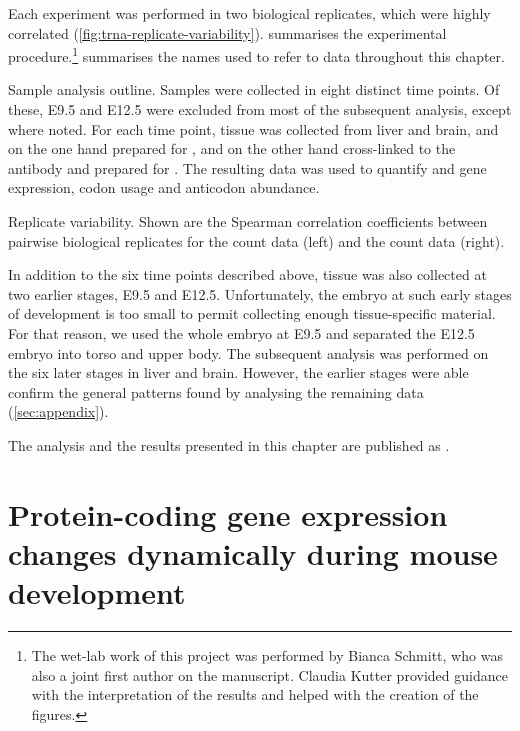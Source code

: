 Each experiment was performed in two biological replicates, which were highly
correlated (\cref{fig:trna-replicate-variability}).
 summarises the experimental
procedure.\footnote{The wet-lab work of this project was performed by Bianca
Schmitt, who was also a joint first author on the manuscript. Claudia Kutter
provided guidance with the interpretation of the results and helped with the
creation of the figures.}  summarises the names used to
refer to data throughout this chapter.

    {Sample analysis outline.}
    {Samples were collected in eight distinct time points. Of these, E9.5 and
    E12.5 were excluded from most of the subsequent analysis, except where
    noted. For each time point, tissue was collected from liver and brain, and
    on the one hand prepared for \rnaseq, and on the other hand cross-linked to
    the  antibody and prepared for \chipseq. The resulting data was used to
    quantify \mrna and \trna gene expression, codon usage and \trna anticodon
    abundance.}

    {Replicate variability.}
    {Shown are the Spearman correlation coefficients between pairwise biological
    replicates for the \trna count data (left) and the \mrna count data (right).}

In addition to the six time points described above, tissue was also collected at
two earlier stages, E9.5 and E12.5. Unfortunately, the embryo at such early
stages of development is too small to permit collecting enough tissue-specific
material. For that reason, we used the whole embryo at E9.5 and separated the
E12.5 embryo into torso and upper body. The subsequent analysis was performed on
the six later stages in liver and brain. However, the earlier stages were able
confirm the general patterns found by analysing the remaining data
(\cref{sec:appendix}).

The analysis and the results presented in this chapter are published as
 \citet{Schmitt:2014}.

\section{Protein-coding gene expression changes dynamically during mouse
development}

